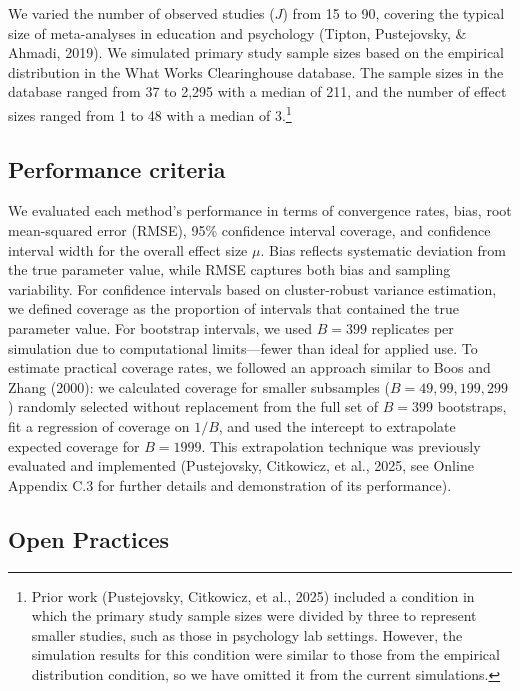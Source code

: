 \documentclass[
  american,
  man, donotrepeattitle,floatsintext]{apa7}
\begin{document}
We varied the number of observed studies (\(J\)) from 15 to 90, covering the typical size of meta-analyses in education and psychology (Tipton, Pustejovsky, \& Ahmadi, 2019).
We simulated primary study sample sizes based on the empirical distribution in the What Works Clearinghouse database. The sample sizes in the database ranged from 37 to 2,295 with a median of 211, and the number of effect sizes ranged from 1 to 48 with a median of 3.\footnote{
  Prior work (Pustejovsky, Citkowicz, et al., 2025) included a condition in which the primary study sample sizes were divided by three to represent smaller studies, such as those in psychology lab settings. However, the simulation results for this condition were similar to those from the empirical distribution condition, so we have omitted it from the current simulations.}

\subsection{Performance criteria}\label{performance-criteria}

We evaluated each method's performance in terms of convergence rates, bias, root mean-squared error (RMSE), 95\% confidence interval coverage, and confidence interval width for the overall effect size \(\mu\). Bias reflects systematic deviation from the true parameter value, while RMSE captures both bias and sampling variability.
For confidence intervals based on cluster-robust variance estimation, we defined coverage as the proportion of intervals that contained the true parameter value. For bootstrap intervals, we used \(B = 399\) replicates per simulation due to computational limits---fewer than ideal for applied use. To estimate practical coverage rates, we followed an approach similar to Boos and Zhang (2000): we calculated coverage for smaller subsamples (\(B = 49, 99, 199, 299\)) randomly selected without replacement from the full set of \(B = 399\) bootstraps, fit a regression of coverage on \(1/B\), and used the intercept to extrapolate expected coverage for \(B = 1999\).
This extrapolation technique was previously evaluated and implemented (Pustejovsky, Citkowicz, et al., 2025, see Online Appendix C.3 for further details and demonstration of its performance).

\subsection{Open Practices}\label{open-practices}
\end{document}

